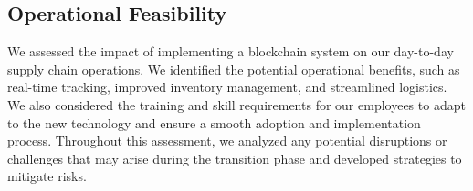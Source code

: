 
  
  
  




  
  



\subsection{Operational Feasibility}
\noindent We assessed the impact of implementing a blockchain system on our day-to-day supply chain operations. We identified the potential operational benefits, such as real-time tracking, improved inventory management, and streamlined logistics. We also considered the training and skill requirements for our employees to adapt to the new technology and ensure a smooth adoption and implementation process. Throughout this assessment, we analyzed any potential disruptions or challenges that may arise during the transition phase and developed strategies to mitigate risks.

